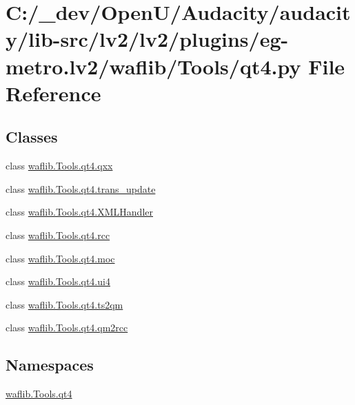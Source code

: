 \hypertarget{lv2_2plugins_2eg-metro_8lv2_2waflib_2_tools_2qt4_8py}{}\section{C\+:/\+\_\+dev/\+Open\+U/\+Audacity/audacity/lib-\/src/lv2/lv2/plugins/eg-\/metro.lv2/waflib/\+Tools/qt4.py File Reference}
\label{lv2_2plugins_2eg-metro_8lv2_2waflib_2_tools_2qt4_8py}
\subsection*{Classes}
\begin{DoxyCompactItemize}
\item 
class \hyperlink{classwaflib_1_1_tools_1_1qt4_1_1qxx}{waflib.\+Tools.\+qt4.\+qxx}
\item 
class \hyperlink{classwaflib_1_1_tools_1_1qt4_1_1trans__update}{waflib.\+Tools.\+qt4.\+trans\+\_\+update}
\item 
class \hyperlink{classwaflib_1_1_tools_1_1qt4_1_1_x_m_l_handler}{waflib.\+Tools.\+qt4.\+X\+M\+L\+Handler}
\item 
class \hyperlink{classwaflib_1_1_tools_1_1qt4_1_1rcc}{waflib.\+Tools.\+qt4.\+rcc}
\item 
class \hyperlink{classwaflib_1_1_tools_1_1qt4_1_1moc}{waflib.\+Tools.\+qt4.\+moc}
\item 
class \hyperlink{classwaflib_1_1_tools_1_1qt4_1_1ui4}{waflib.\+Tools.\+qt4.\+ui4}
\item 
class \hyperlink{classwaflib_1_1_tools_1_1qt4_1_1ts2qm}{waflib.\+Tools.\+qt4.\+ts2qm}
\item 
class \hyperlink{classwaflib_1_1_tools_1_1qt4_1_1qm2rcc}{waflib.\+Tools.\+qt4.\+qm2rcc}
\end{DoxyCompactItemize}
\subsection*{Namespaces}
\begin{DoxyCompactItemize}
\item 
 \hyperlink{namespacewaflib_1_1_tools_1_1qt4}{waflib.\+Tools.\+qt4}
\end{DoxyCompactItemize}
